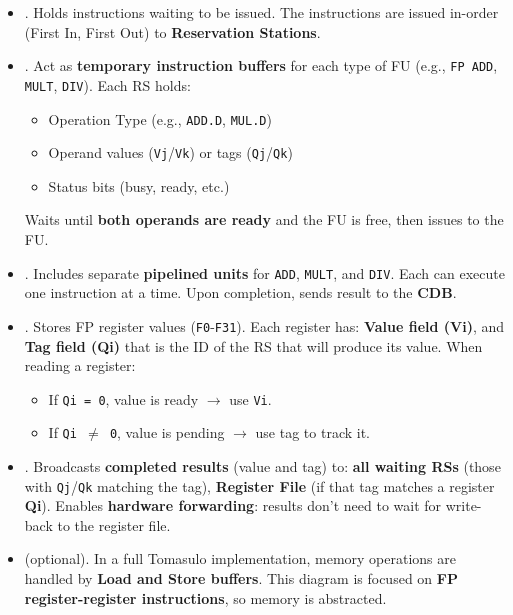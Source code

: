 \begin{itemize}
    \item {}. Holds instructions waiting to be issued. The instructions are issued in-order (First In, First Out) to \textbf{Reservation Stations}.
    
    \item {}. Act as \textbf{temporary instruction buffers} for each type of FU (e.g., \texttt{FP ADD}, \texttt{MULT}, \texttt{DIV}). Each RS holds:
    \begin{itemize}
        \item Operation Type (e.g., \texttt{ADD.D}, \texttt{MUL.D})
        \item Operand values (\texttt{Vj}/\texttt{Vk}) or tags (\texttt{Qj}/\texttt{Qk})
        \item Status bits (busy, ready, etc.)
    \end{itemize}
    Waits until \textbf{both operands are ready} and the FU is free, then issues to the FU.

    \item {}. Includes separate \textbf{pipelined units} for \texttt{ADD}, \texttt{MULT}, and \texttt{DIV}. Each can execute one instruction at a time. Upon completion, sends result to the \textbf{CDB}.
    
    \item {}. Stores FP register values (\texttt{F0}-\texttt{F31}). Each register has: \textbf{Value field (Vi)}, and \textbf{Tag field (Qi)} that is the ID of the RS that will produce its value. When reading a register:
    \begin{itemize}
        \item If \texttt{Qi = 0}, value is ready $\rightarrow$ use \texttt{Vi}.
        \item If \texttt{Qi $\ne$ 0}, value is pending $\rightarrow$ use tag to track it.
    \end{itemize}

    \item {}. Broadcasts \textbf{completed results} (value and tag) to: \textbf{all waiting RSs} (those with \texttt{Qj}/\texttt{Qk} matching the tag), \textbf{Register File} (if that tag matches a register \textbf{Qi}). Enables \textbf{hardware forwarding}: results don't need to wait for write-back to the register file.
    
    \item {} (optional). In a full Tomasulo implementation, memory operations are handled by \textbf{Load and Store buffers}. This diagram is focused on \textbf{FP register-register instructions}, so memory is abstracted.
\end{itemize}

